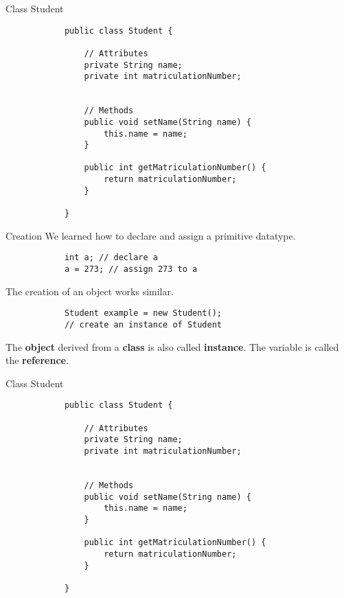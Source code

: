 	\begin{frame}[fragile]{Class Student}
		\begin{lstlisting}
			public class Student {
				
				// Attributes
				private String name; 
				private int matriculationNumber; 
				
				
				// Methods
				public void setName(String name) {
					this.name = name;
				}
				
				public int getMatriculationNumber() {
					return matriculationNumber;
				}
				
			}
		\end{lstlisting}
		
		
	\end{frame}
	
	\begin{frame}[fragile]{Creation}
		We learned how to declare and assign a primitive datatype.
		
		\begin{lstlisting}
			int a; // declare a
			a = 273; // assign 273 to a
		\end{lstlisting} 
		
		The creation of an object works similar.
		
		\begin{lstlisting}
			Student example = new Student(); 
			// create an instance of Student
		\end{lstlisting}
		The \textbf{object} derived from a \textbf{class} is also called \textbf{instance}.
		The variable is called the \textbf{reference}.
	\end{frame}

	\begin{frame}[fragile]{Class Student}
		\begin{lstlisting}
			public class Student {
				
				// Attributes
				private String name; 
				private int matriculationNumber; 
				
				
				// Methods
				public void setName(String name) {
					this.name = name;
				}
				
				public int getMatriculationNumber() {
					return matriculationNumber;
				}
				
			}
		\end{lstlisting}
		
		
	\end{frame}

